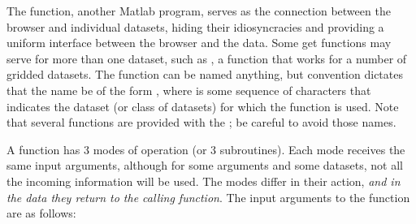 The  function, another Matlab program, serves as the connection
between the \opendap browser and individual datasets, hiding their
idiosyncracies and providing a uniform interface between the browser
and the data. Some get functions may serve for more than one dataset,
such as , a function that works for a number of
gridded datasets.  The  function can be named anything, but
  convention dictates that the name be of
the form , where  is some sequence
of characters that indicates the dataset (or class of datasets) for
which the  function is used.  Note that several 
functions are provided with the \GUI ; be careful to avoid those
names.

A  function has 3 modes of operation (or 3 subroutines).
Each mode receives the same input arguments, although for some
arguments and some datasets, not all the incoming information will be
used.  The modes differ in their action, \emph{and in the data they
  return to the calling function}.  The input arguments to the
 function are as follows:



